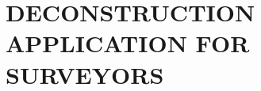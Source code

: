 \section{\uppercase{Deconstruction Application for surveyors}}
\label{sec:introduction}



\noindent\lipsum[2-4]


